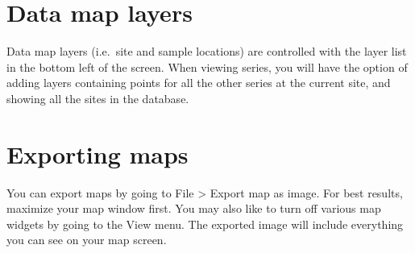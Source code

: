 \section{Data map layers}
Data map layers (i.e.\ site and sample locations) are controlled with the layer list in the bottom left of the screen. When viewing series, you will have the option of adding layers containing points for all the other series at the current site, and showing all the sites in the database. 


\section{Exporting maps}
You can export maps by going to File > Export map as image. For best results, maximize your map window first. You may also like to turn off various map widgets by going to the View menu. The exported image will include everything you can see on your map screen. 


